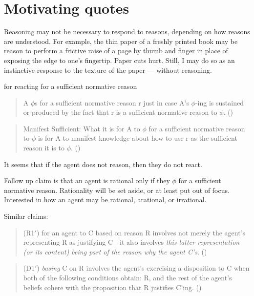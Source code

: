 \documentclass[10pt]{article}
\begin{document}
\section{Motivating quotes}
\label{sec:motivating-quotes}

Reasoning may not be necessary to respond to reasons, depending on how reasons are understood.
For example, the thin paper of a freshly printed book may be reason to perform a frictive raise of a page by thumb and finger in place of exposing the edge to one's fingertip.
Paper cuts hurt.
Still, I may do so as an instinctive response to the texture of the paper --- without reasoning.


for reacting for a sufficient normative reason
\begin{quote}
  A \(\phi\)s for a sufficient normative reason r just in case A’s \(\phi\)-ing is sustained or produced by the fact that r is a sufficient normative reason to \(\phi\).\nolinebreak
  \mbox{}\hfill\mbox{(\citeyear[142]{Lord:2018aa})}
\end{quote}

\begin{quote}
  Manifest Sufficient: What it is for A to \(\phi\) for a sufficient normative reason to \(\phi\) is for A to manifest knowledge about how to use r as the sufficient reason it is to \(\phi\).\nolinebreak
  \mbox{}\hfill\mbox{(\citeyear[143]{Lord:2018aa})}
\end{quote}

It seems that if the agent does not reason, then they do not react.

Follow up claim is that an agent is rational only if they \(\phi\) for a sufficient normative reason.
Rationality will be set aside, or at least put out of focus.
Interested in how an agent may be rational, arational, or irrational.

Similar claims:

\begin{quote}
  (R1\('\)) for an agent to C based on reason R involves not merely the agent’s representing R as justifying C---it also involves \emph{this latter representation (or its content) being part of the reason why the agent C's}.\nolinebreak
  \mbox{}\hfill\mbox{(\citeyear[197]{Neta:2019aa})}
\end{quote}

\begin{quote}
  (D1\('\)) \emph{basing} C on R involves the agent's exercising a disposition to C when both of the following conditions obtain: R, and the rest of the agent’s beliefs cohere with the proposition that R justiﬁes C'ing.\nolinebreak
  \mbox{}\hfill\mbox{(\citeyear[194]{Neta:2019aa})}
\end{quote}
\end{document}
